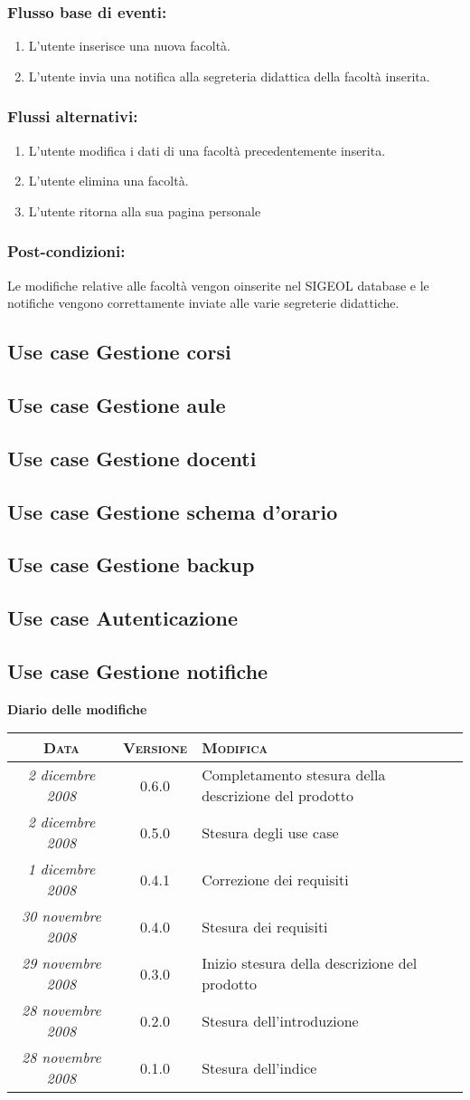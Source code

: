 \documentclass[11pt,a4paper]{article}
\newcommand{\modifiche} 
{
\newpage
\begin{center}
\textbf{Diario delle modifiche} \\
\bigskip
\begin{tabular}{|c|c|p{0.51\textwidth}|}
\hline
\textsc{Data} & \textsc{Versione} & \textsc{Modifica} \\
\hline
\hline
\textit{2 dicembre 2008} & 0.6.0 & Completamento stesura della descrizione del prodotto \\
\hline
\textit{2 dicembre 2008} & 0.5.0 & Stesura degli use case \\
\hline
\textit{1 dicembre 2008} & 0.4.1 & Correzione dei requisiti \\
\hline
\textit{30 novembre 2008} & 0.4.0 & Stesura dei requisiti \\
\hline
\textit{29 novembre 2008} & 0.3.0 & Inizio stesura della descrizione del prodotto \\
\hline
\textit{28 novembre 2008} & 0.2.0 & Stesura dell'introduzione \\
\hline
\textit{28 novembre 2008} & 0.1.0 & Stesura dell'indice \\
\hline
\end{tabular}
\end{center}
}
\begin{document}
\subsubsection*{Flusso base di eventi:}
\begin{enumerate}
 \item L'utente inserisce una nuova facoltà.
 \item L'utente invia una notifica alla segreteria didattica della facoltà inserita.
\end{enumerate}

\subsubsection*{Flussi alternativi:}
\begin{enumerate}
 \item L'utente modifica i dati di una facoltà precedentemente inserita.
 \item L'utente elimina una facoltà.
 \item L'utente ritorna alla sua pagina personale
\end{enumerate}

\subsubsection*{Post-condizioni:}
Le modifiche relative alle facoltà vengon oinserite nel SIGEOL database e le notifiche vengono correttamente 
inviate alle varie segreterie didattiche.

\subsection{Use case Gestione corsi}
\subsection{Use case Gestione aule}
\subsection{Use case Gestione docenti}
\subsection{Use case Gestione schema d'orario}
\subsection{Use case Gestione backup}
\subsection{Use case Autenticazione}
\subsection{Use case Gestione notifiche}
\modifiche
\end{document}

